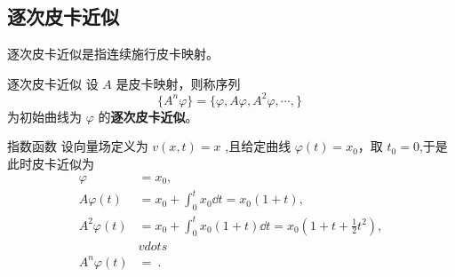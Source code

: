 \subsection{逐次皮卡近似}
逐次皮卡近似是指连续施行皮卡映射。
\begin{definition}{逐次皮卡近似}
设 $A$ 是皮卡映射，则称序列
\begin{equation}
\{A^n\varphi\}=\{\varphi, A\varphi, A^2\varphi,\cdots,\}~ 
\end{equation}
为初始曲线为 $\varphi$ 的\textbf{逐次皮卡近似}。
\end{definition}
\begin{example}{指数函数}
设向量场定义为 $v(x,t)=x$ ,且给定曲线 $\varphi(t)=x_0$，取 $t_0=0$,于是此时皮卡近似为
\begin{equation}
\begin{aligned}
\varphi&=x_0,\\
A\varphi(t)&=x_0+\int_{0}^{t}x_0\dd t=x_0(1+t),\\
A^2\varphi(t)&=x_0+\int_{0}^{t}x_0(1+t)\dd t=x_0(1+t+\frac{1}{2}t^2),\\
&vdots\\
A^n\varphi(t)&=
~.
\end{aligned}
\end{equation}

\end{example}